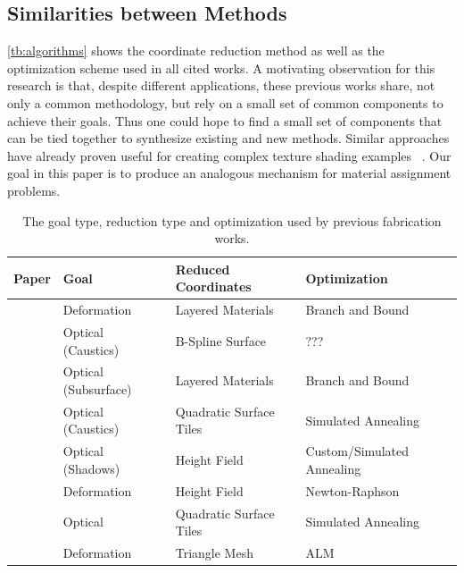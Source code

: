 \documentclass[annual]{acmsiggraph}
\begin{document}
\subsection{Similarities between Methods}
\autoref{tb:algorithms} shows the coordinate reduction method as well as the optimization scheme used in all cited works. A motivating observation for this research is that, despite different applications, these previous works share, not only a common methodology, but rely on a small set of common components to achieve their goals. Thus one could hope to find a small set of components that can be tied together to synthesize existing and new methods. Similar approaches have already proven useful for creating complex texture shading examples ~\cite{Cook1984}. Our goal in this paper is to produce an analogous mechanism for material assignment problems. 
\begin{table}[htp]
\centering
\caption{The goal type, reduction type and optimization used by previous fabrication works.}
\begin{tabular}{clll}
\hline
\textbf{Paper} & \textbf{Goal} & \textbf{Reduced Coordinates}  & \textbf{Optimization} \\ 
\hline
~\cite{Bickel:2010}& Deformation & Layered Materials  & Branch and Bound \\
~\cite{Finckh:2010} & Optical (Caustics) & B-Spline Surface & ??? \\
~\cite{Hasan:2010}& Optical (Subsurface) & Layered Materials & Branch and Bound\\ 
~\cite{Marios:2011} & Optical (Caustics) & Quadratic Surface Tiles & Simulated Annealing \\
~\cite{Bermano:2012} & Optical (Shadows) & Height Field & Custom/Simulated Annealing \\
~\cite{Bickel:2012} & Deformation &  Height Field &  Newton-Raphson \\
~\cite{Papas:2012} & Optical & Quadratic Surface Tiles & Simulated Annealing \\
~\cite{sko:2012}& Deformation & Triangle Mesh & ALM \\
\hline
\end{tabular}
\label{tb:algorithms}
\end{table}
\end{document}
